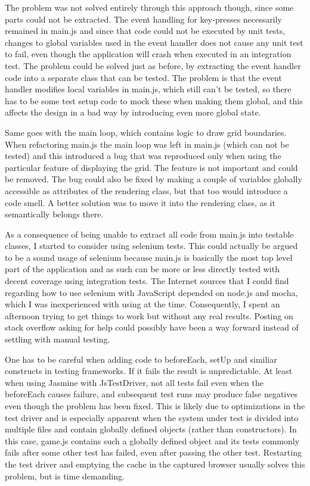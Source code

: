 \documentclass[11pt]{article}
\begin{document}
The problem was not solved entirely through this approach though, since some parts could not be extracted. The event handling for key-presses necessarily remained in main.js and since that code could not be executed by unit tests, changes to global variables used in the event handler does not cause any unit test to fail, even though the application will crash when executed in an integration test. The problem could be solved just as before, by extracting the event handler code into a separate class that can be tested. The problem is that the event handler modifies local variables in main.js, which still can't be tested, so there has to be some test setup code to mock these when making them global, and this affects the design in a bad way by introducing even more global state.

Same goes with the main loop, which contains logic to draw grid boundaries. When refactoring main.js the main loop was left in main.js (which can not be tested) and this introduced a bug that was reproduced only when using the particular feature of displaying the grid. The feature is not important and could be removed. The bug could also be fixed by making a couple of variables globally accessible as attributes of the rendering class, but that too would introduce a code smell. A better solution was to move it into the rendering class, as it semantically belongs there.

As a consequence of being unable to extract all code from main.js into testable classes, I started to consider using selenium tests. This could actually be argued to be a sound usage of selenium because main.js is basically the most top level part of the application and as such can be more or less directly tested with decent coverage using integration tests. The Internet sources that I could find regarding how to use selenium with JavaScript depended on node.js and mocha, which I was inexperienced with using at the time. Consequently, I spent an afternoon trying to get things to work but without any real results. Posting on stack overflow asking for help could possibly have been a way forward instead of settling with manual testing.

One has to be careful when adding code to beforeEach, setUp and similiar constructs in testing frameworks. If it fails the result is unpredictable. At least when using Jasmine with JsTestDriver, not all tests fail even when the beforeEach causes failure, and subsequent test runs may produce false negatives even though the problem has been fixed. This is likely due to optimizations in the test driver and is especially apparent when the system under test is divided into multiple files and contain globally defined objects (rather than constructors). In this case, game.js contains such a globally defined object and its tests commonly fails after some other test has failed, even after passing the other test. Restarting the test driver and emptying the cache in the captured browser usually solves this problem, but is time demanding.
\end{document}
